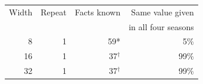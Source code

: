 \begin{tabular}{@{}rrrr@{}}
\toprule
Width & Repeat & Facts known & Same value given \\
 & & & in all four seasons \\
\midrule
8 & 1 & 59* & 5\% \\
16 & 1 & 37$^{\dagger}$ & 99\% \\
32 & 1 & 37$^{\dagger}$ & 99\% \\
\bottomrule
\end{tabular}
